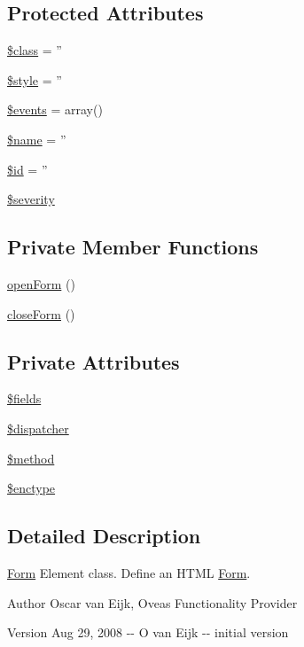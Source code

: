 \subsection*{Protected Attributes}
\begin{DoxyCompactItemize}
\item 
\hyperlink{classBaseElement_a99976a8e967db92e7800309f359b0803}{\$class} = ''
\item 
\hyperlink{classBaseElement_a429a3d642dd95f30e1059ef29564b87d}{\$style} = ''
\item 
\hyperlink{classBaseElement_a02cebe45d277b4ff8f29db08bad371ba}{\$events} = array()
\item 
\hyperlink{classBaseElement_a30b8cff187a9de659a70daf287d66f45}{\$name} = ''
\item 
\hyperlink{classBaseElement_a11b6989c43b53869a09f5ce65aa55b45}{\$id} = ''
\item 
\hyperlink{class__OWL_ad26b40a9dbbacb33e299b17826f8327c}{\$severity}
\end{DoxyCompactItemize}
\subsection*{Private Member Functions}
\begin{DoxyCompactItemize}
\item 
\hyperlink{classForm_a94902cc2869e1608247d9204036af7d1}{openForm} ()
\item 
\hyperlink{classForm_a9bb2df9ed7b866b0dc4b29b3874c2a1a}{closeForm} ()
\end{DoxyCompactItemize}
\subsection*{Private Attributes}
\begin{DoxyCompactItemize}
\item 
\hyperlink{classForm_abcb1c4022c2b93073a00ae65f3269d5b}{\$fields}
\item 
\hyperlink{classForm_ab02292e715af1dc9b0499dd20900aa92}{\$dispatcher}
\item 
\hyperlink{classForm_a3ca31ec7032a41b95c94de22a850672c}{\$method}
\item 
\hyperlink{classForm_a9c23b3ec186995d3df3ad6d4d5efc134}{\$enctype}
\end{DoxyCompactItemize}


\subsection{Detailed Description}
\hyperlink{classForm}{Form} Element class. Define an HTML \hyperlink{classForm}{Form}. \begin{DoxyAuthor}{Author}
Oscar van Eijk, Oveas Functionality Provider 
\end{DoxyAuthor}
\begin{DoxyVersion}{Version}
Aug 29, 2008 -\/-\/ O van Eijk -\/-\/ initial version 
\end{DoxyVersion}


